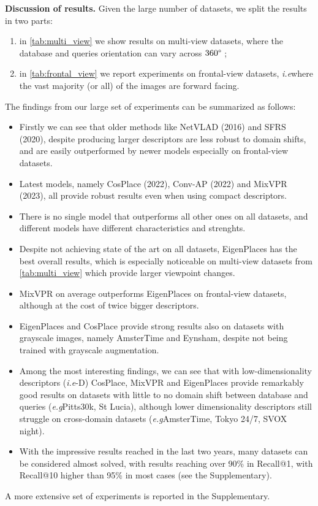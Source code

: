 \documentclass[10pt,twocolumn,letterpaper]{article}
\def\eg{\emph{e.g}\onedot}
\def\ie{\emph{i.e}\onedot}
\newcommand{\myparagraph}[1]{\vspace{4pt}\noindent\textbf{#1}}
\begin{document}
\myparagraph{Discussion of results.}
Given the large number of datasets, we split the results in two parts:
\begin{enumerate}[noitemsep,topsep=1pt]
    \item in \cref{tab:multi_view} we show results on multi-view datasets, where the database and queries orientation can vary across $360 \degree$ ;
    \item in \cref{tab:frontal_view} we report experiments on frontal-view datasets, \ie where the vast majority (or all) of the images are forward facing.
\end{enumerate}
The findings from our large set of experiments can be summarized as follows:
\begin{itemize}[noitemsep,topsep=1pt]
\item Firstly we can see that older methods like NetVLAD (2016) and SFRS (2020), despite producing larger descriptors are less robust to domain shifts, and are easily outperformed by newer models especially on frontal-view datasets.
\item Latest models, namely CosPlace (2022), Conv-AP (2022) and MixVPR (2023), all provide robust results even when using compact descriptors.
\item There is no single model that outperforms all other ones on all datasets, and different models have different characteristics and strenghts.
\item Despite not achieving state of the art on all datasets, EigenPlaces has the best overall results, which is especially noticeable on multi-view datasets from \cref{tab:multi_view} which provide larger viewpoint changes.
\item MixVPR on average outperforms EigenPlaces on frontal-view datasets, although at the cost of twice bigger descriptors.
\item EigenPlaces and CosPlace provide strong results also on datasets with grayscale images, namely AmsterTime and Eynsham, despite not being trained with grayscale augmentation.
\item Among the most interesting findings, we can see that with low-dimensionality descriptors (\ie 128-D) CosPlace, MixVPR and EigenPlaces provide remarkably good results on datasets with little to no domain shift between database and queries (\eg Pitts30k, St Lucia), although lower dimensionality descriptors still struggle on cross-domain datasets (\eg AmsterTime, Tokyo 24/7, SVOX night).
\item With the impressive results reached in the last two years, many datasets can be considered almost solved, with results reaching over 90\% in Recall@1, with Recall@10 higher than 95\% in most cases (see the Supplementary).
\end{itemize}
A more extensive set of experiments is reported in the Supplementary.
\end{document}
